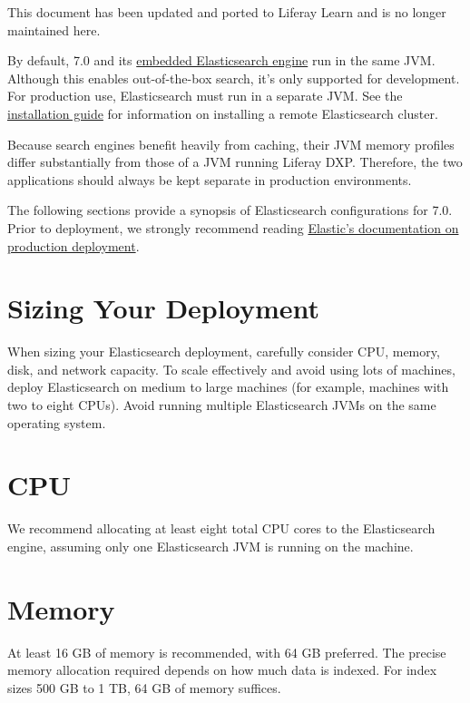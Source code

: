 {This document has been updated and ported to Liferay Learn and is no
longer maintained here.}

By default, 7.0 and its
\href{/docs/7-2/deploy/-/knowledge_base/d/elasticsearch\#embedded-vs-remote-operation-mode}{embedded
Elasticsearch engine} run in the same JVM. Although this enables
out-of-the-box search, it's only supported for development. For
production use, Elasticsearch must run in a separate JVM. See the
\href{/docs/7-2/deploy/-/knowledge_base/d/installing-elasticsearch}{installation
guide} for information on installing a remote Elasticsearch cluster.

Because search engines benefit heavily from caching, their JVM memory
profiles differ substantially from those of a JVM running Liferay DXP.
Therefore, the two applications should always be kept separate in
production environments.

The following sections provide a synopsis of Elasticsearch
configurations for 7.0. Prior to deployment, we strongly recommend
reading
\href{https://www.elastic.co/guide/en/elasticsearch/reference/7.x/index.html}{Elastic's
documentation on production deployment}.

\section{Sizing Your Deployment}\label{sizing-your-deployment}

When sizing your Elasticsearch deployment, carefully consider CPU,
memory, disk, and network capacity. To scale effectively and avoid using
lots of machines, deploy Elasticsearch on medium to large machines (for
example, machines with two to eight CPUs). Avoid running multiple
Elasticsearch JVMs on the same operating system.

\section{CPU}\label{cpu}

We recommend allocating at least eight total CPU cores to the
Elasticsearch engine, assuming only one Elasticsearch JVM is running on
the machine.

\section{Memory}\label{memory}

At least 16 GB of memory is recommended, with 64 GB preferred. The
precise memory allocation required depends on how much data is indexed.
For index sizes 500 GB to 1 TB, 64 GB of memory suffices.

